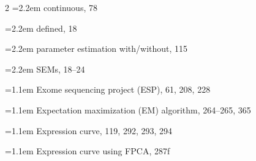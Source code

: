 \begin{multicols}{2}
\noindent\hangindent=2.2em \hspace*{1.1em}continuous, 78\par
\noindent\hangindent=2.2em \hspace*{1.1em}defined, 18\par
\noindent\hangindent=2.2em \hspace*{1.1em}parameter estimation with/without, 115\par
\noindent\hangindent=2.2em \hspace*{1.1em}SEMs, 18--24\par
\noindent\hangindent=1.1em Exome sequencing project (ESP), 61, 208, 228\par
\noindent\hangindent=1.1em Expectation maximization (EM) algorithm, 264--265, 365\par
\noindent\hangindent=1.1em Expression curve, 119, 292, 293, 294\par
\noindent\hangindent=1.1em Expression curve using FPCA, 287f\par


\end{multicols}
